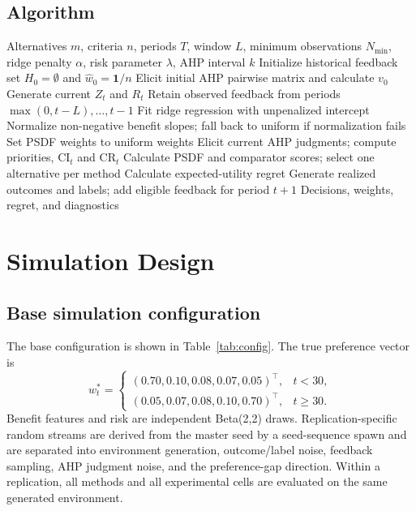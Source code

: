 \documentclass[12pt,a4paper]{article}
\begin{document}
\subsection{Algorithm}
\begin{algorithm}[t]
\caption{Sequential PSDF and AHP evaluation protocol}
\begin{algorithmic}[1]
\Require Alternatives $m$, criteria $n$, periods $T$, window $L$, minimum observations $N_{\min}$, ridge penalty $\alpha$, risk parameter $\lambda$, AHP interval $k$
\State Initialize historical feedback set $H_0=\emptyset$ and $\hat w_0=\mathbf 1/n$
\State Elicit initial AHP pairwise matrix and calculate $v_0$
  \State Generate current $Z_t$ and $R_t$
  \State Retain observed feedback from periods $\max(0,t-L),\dots,t-1$
    \State Fit ridge regression with unpenalized intercept
    \State Normalize non-negative benefit slopes; fall back to uniform if normalization fails
  \Else
    \State Set PSDF weights to uniform weights
  \EndIf
    \State Elicit current AHP judgments; compute priorities, $\mathrm{CI}_t$ and $\mathrm{CR}_t$
  \EndIf
  \State Calculate PSDF and comparator scores; select one alternative per method
  \State Calculate expected-utility regret
  \State Generate realized outcomes and labels; add eligible feedback for period $t+1$
\EndFor
\State \Return Decisions, weights, regret, and diagnostics
\end{algorithmic}
\end{algorithm}

\section{Simulation Design}
\subsection{Base simulation configuration}
The base configuration is shown in Table~\ref{tab:config}. The true preference vector is
\begin{equation}w^*_t=\begin{cases}(0.70,0.10,0.08,0.07,0.05)^\top,&t<30,\\(0.05,0.07,0.08,0.10,0.70)^\top,&t\ge30.\end{cases}\end{equation}
Benefit features and risk are independent Beta(2,2) draws. Replication-specific random streams are derived from the master seed by a seed-sequence spawn and are separated into environment generation, outcome/label noise, feedback sampling, AHP judgment noise, and the preference-gap direction. Within a replication, all methods and all experimental cells are evaluated on the same generated environment.
\end{document}
